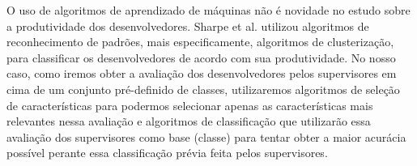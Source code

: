 O uso de algoritmos de aprendizado de máquinas não é novidade no estudo sobre a produtividade dos desenvolvedores. Sharpe et al. \cite{Sharpe2005} utilizou algoritmos de reconhecimento de padrões, mais especificamente, algoritmos de clusterização, para classificar os desenvolvedores de acordo com sua produtividade. No nosso caso, como iremos obter a avaliação dos desenvolvedores pelos supervisores em cima de um conjunto pré-definido de classes, utilizaremos algoritmos de seleção de características para podermos selecionar apenas as características mais relevantes nessa avaliação e algoritmos de classificação que utilizarão essa avaliação dos supervisores como base (classe) para tentar obter a maior acurácia possível perante essa classificação prévia feita pelos supervisores.


